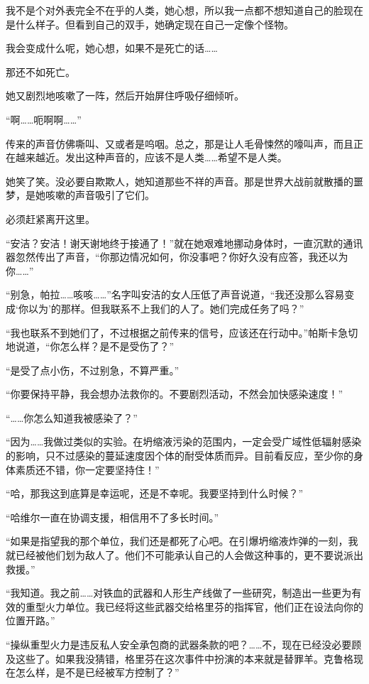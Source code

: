 我不是个对外表完全不在乎的人类，她心想，所以我一点都不想知道自己的脸现在是什么样子。但看到自己的双手，她确定现在自己一定像个怪物。

我会变成什么呢，她心想，如果不是死亡的话……

那还不如死亡。

她又剧烈地咳嗽了一阵，然后开始屏住呼吸仔细倾听。

“啊……呃啊啊……”

传来的声音仿佛嘶叫、又或者是呜咽。总之，那是让人毛骨悚然的嚎叫声，而且正在越来越近。发出这种声音的，应该不是人类……希望不是人类。

她笑了笑。没必要自欺欺人，她知道那些不祥的声音。那是世界大战前就散播的噩梦，是她咳嗽的声音吸引了它们。

必须赶紧离开这里。

“安洁？安洁！谢天谢地终于接通了！”就在她艰难地挪动身体时，一直沉默的通讯器忽然传出了声音，“你那边情况如何，你没事吧？你好久没有应答，我还以为你……”

“别急，帕拉……咳咳……”名字叫安洁的女人压低了声音说道，“我还没那么容易变成‘你以为’的那样。但我联系不上我们的人了。她们完成任务了吗？”

“我也联系不到她们了，不过根据之前传来的信号，应该还在行动中。”帕斯卡急切地说道，“你怎么样？是不是受伤了？”

“是受了点小伤，不过别急，不算严重。”

“你要保持平静，我会想办法救你的。不要剧烈活动，不然会加快感染速度！”

“……你怎么知道我被感染了？”

“因为……我做过类似的实验。在坍缩液污染的范围内，一定会受广域性低辐射感染的影响，只不过感染的蔓延速度因个体的耐受体质而异。目前看反应，至少你的身体素质还不错，你一定要坚持住！”

“哈，那我这到底算是幸运呢，还是不幸呢。我要坚持到什么时候？”

“哈维尔一直在协调支援，相信用不了多长时间。”

“如果是指望我的那个单位，我们还是都死了心吧。在引爆坍缩液炸弹的一刻，我就已经被他们划为敌人了。他们不可能承认自己的人会做这种事的，更不要说派出救援。”

“我知道。我之前……对铁血的武器和人形生产线做了一些研究，制造出一些更为有效的重型火力单位。我已经将这些武器交给格里芬的指挥官，他们正在设法向你的位置开路。”

“操纵重型火力是违反私人安全承包商的武器条款的吧？……不，现在已经没必要顾及这些了。如果我没猜错，格里芬在这次事件中扮演的本来就是替罪羊。克鲁格现在怎么样，是不是已经被军方控制了？”

